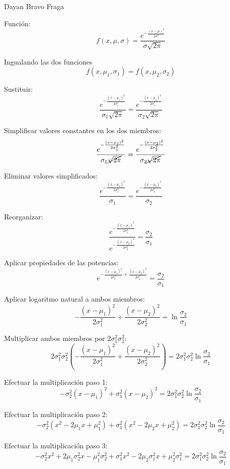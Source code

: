 \documentclass[24pt]{article}
\newcommand{\paren}[1]{\left( #1 \right)}
\begin{document}
	Dayan Bravo Fraga

	Función:
	\[
		f(x,\mu,\sigma)
		= \frac{
			e^{ -\frac{(x-\mu)^2}{2\sigma^2}}
		}{
			\sigma\sqrt{2\pi}
		}
	\]

	Ingualando las dos funciones
	\[
		f(x,\mu_1,\sigma_1) = f(x,\mu_2,\sigma_2)
	\]

	Sustituir:
	\[
		\frac{
			e^{ -\frac{(x-\mu_1)^2}{2\sigma_1^2}}
		}{
			\sigma_1\sqrt{2\pi}
		}
		=
		\frac{
			e^{ -\frac{(x-\mu_2)^2}{2\sigma_2^2}}
		}{
			\sigma_2\sqrt{2\pi}
		}
	\]

	Simplificar valores constantes en los dos miembros:
	\[
		\frac{
			e^{ -\frac{(x-\mu_1)^2}{2\sigma_1^2}}
		}{
			\sigma_1\cancel{\sqrt{2\pi}}
		}
		=
		\frac{
			e^{ -\frac{(x-\mu_2)^2}{2\sigma_2^2}}
		}{
			\sigma_2\cancel{\sqrt{2\pi}}
		}
	\]

	Eliminar valores simplificados:
	\[
		\frac{
			e^{ -\frac{(x-\mu_1)^2}{2\sigma_1^2}}
		}{
			\sigma_1
		}
		=
		\frac{
			e^{ -\frac{(x-\mu_2)^2}{2\sigma_2^2}}
		}{
			\sigma_2
		}
	\]

	Reorganizar:
	\[
		\frac{
			e^{ -\frac{(x-\mu_1)^2}{2\sigma_1^2}}
		}{
			e^{ -\frac{(x-\mu_2)^2}{2\sigma_2^2}}
		}
		=
		\frac{\sigma_2}{\sigma_1}
	\]

	Aplicar propiedades de las potencias:
	\[
		e^{ -\frac{(x-\mu_1)^2}{2\sigma_1^2}+\frac{(x-\mu_2)^2}{2\sigma_2^2}}
		=
		\frac{\sigma_2}{\sigma_1}
	\]

	Aplicar logaritmo natural a ambos miembros:
	\[
		-\frac{(x-\mu_1)^2}{2\sigma_1^2}+\frac{(x-\mu_2)^2}{2\sigma_2^2}
		=
		\ln\frac{\sigma_2}{\sigma_1}
	\]

	Multiplicar ambos miembros por $2\sigma_1^2\sigma_2^2$:
	\[
		2\sigma_1^2\sigma_2^2\paren{-\frac{(x-\mu_1)^2}{2\sigma_1^2}+\frac{(x-\mu_2)^2}{2\sigma_2^2}}
		=
		2\sigma_1^2\sigma_2^2\ln\frac{\sigma_2}{\sigma_1}
	\]

	Efectuar la multiplicación paso 1:
	\[
		-\sigma_2^2(x-\mu_1)^2 + \sigma_1^2(x-\mu_2)^2
		=
		2\sigma_1^2\sigma_2^2\ln\frac{\sigma_2}{\sigma_1}
	\]

	Efectuar la multiplicación paso 2:
	\[
		-\sigma_2^2 \paren{ x^2 -2\mu_1x +\mu_1^2} + \sigma_1^2  \paren{ x^2 -2\mu_2x +\mu_2^2}
		=
		2\sigma_1^2\sigma_2^2\ln\frac{\sigma_2}{\sigma_1}
	\]

	Efectuar la multiplicación paso 3:
	\[
		-  \sigma_2^2 x^2  +2\mu_1\sigma_2^2 x  -\mu_1^2\sigma_2^2
		+ \sigma_1^2 x^2  -2\mu_2 \sigma_1^2 x +\mu_2^2 \sigma_1^2
		=
		2\sigma_1^2\sigma_2^2\ln\frac{\sigma_2}{\sigma_1}
	\]
\end{document}
